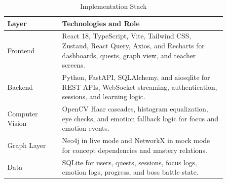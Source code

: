 \begin{table}[!htbp]
\caption{Implementation Stack}
\label{tab:stack}
\centering
\scriptsize
\renewcommand{\arraystretch}{1.08}
\begin{tabular}{p{0.22\linewidth}p{0.66\linewidth}}
\toprule
\textbf{Layer} & \textbf{Technologies and Role} \\
\midrule
Frontend & React 18, TypeScript, Vite, Tailwind CSS, Zustand, React Query, Axios, and Recharts for dashboards, quests, graph view, and teacher screens. \\
Backend & Python, FastAPI, SQLAlchemy, and aiosqlite for REST APIs, WebSocket streaming, authentication, sessions, and learning logic. \\
Computer Vision & OpenCV Haar cascades, histogram equalization, eye checks, and emotion fallback logic for focus and emotion events. \\
Graph Layer & Neo4j in live mode and NetworkX in mock mode for concept dependencies and mastery relations. \\
Data & SQLite for users, quests, sessions, focus logs, emotion logs, progress, and boss battle state. \\
\bottomrule
\end{tabular}
\end{table}
